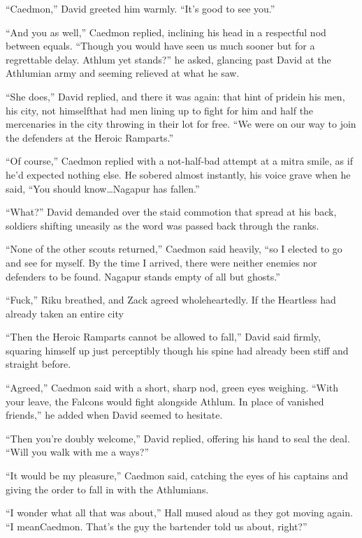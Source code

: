 ``Caedmon,'' David greeted him warmly. ``It's good to see you.''

``And you as well,'' Caedmon replied, inclining his head in a respectful nod between equals. ``Though you would have seen us much sooner but for a regrettable delay. Athlum yet stands?'' he asked, glancing past David at the Athlumian army and seeming relieved at what he saw.

``She does,'' David replied, and there it was again: that hint of pride\textemdash in his men, his city, not himself\textemdash that had men lining up to fight for him and half the mercenaries in the city throwing in their lot for free. ``We were on our way to join the defenders at the Heroic Ramparts.''

``Of course,'' Caedmon replied with a not-half-bad attempt at a mitra smile, as if he'd expected nothing else. He sobered almost instantly, his voice grave when he said, ``You should know\ldots Nagapur has fallen.''

``What?'' David demanded over the staid commotion that spread at his back, soldiers shifting uneasily as the word was passed back through the ranks.

``None of the other scouts returned,'' Caedmon said heavily, ``so I elected to go and see for myself. By the time I arrived, there were neither enemies nor defenders to be found. Nagapur stands empty of all but ghosts.''

``Fuck,'' Riku breathed, and Zack agreed wholeheartedly. If the Heartless had already taken an entire city\textemdash 

``Then the Heroic Ramparts cannot be allowed to fall,'' David said firmly, squaring himself up just perceptibly though his spine had already been stiff and straight before.

``Agreed,'' Caedmon said with a short, sharp nod, green eyes weighing. ``With your leave, the Falcons would fight alongside Athlum. In place of vanished friends,'' he added when David seemed to hesitate.

``Then you're doubly welcome,'' David replied, offering his hand to seal the deal. ``Will you walk with me a ways?''

``It would be my pleasure,'' Caedmon said, catching the eyes of his captains and giving the order to fall in with the Athlumians.

``I wonder what all that was about,'' Hall mused aloud as they got moving again. ``I mean\textemdash Caedmon. That's the guy the bartender told us about, right?''

